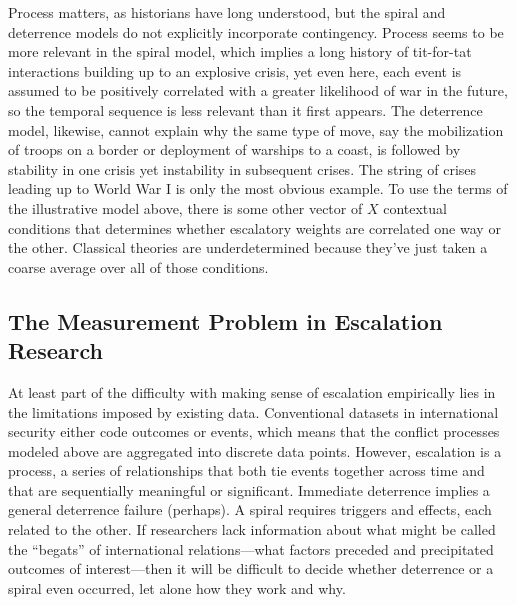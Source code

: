 \documentclass[
  letterpaper,
  DIV=11,
  numbers=noendperiod]{scrartcl}
\begin{document}
Process matters, as historians have long understood, but the spiral and
deterrence models do not explicitly incorporate contingency. Process
seems to be more relevant in the spiral model, which implies a long
history of tit-for-tat interactions building up to an explosive crisis,
yet even here, each event is assumed to be positively correlated with a
greater likelihood of war in the future, so the temporal sequence is
less relevant than it first appears. The deterrence model, likewise,
cannot explain why the same type of move, say the mobilization of troops
on a border or deployment of warships to a coast, is followed by
stability in one crisis yet instability in subsequent crises. The string
of crises leading up to World War I is only the most obvious example. To
use the terms of the illustrative model above, there is some other
vector of \(X\) contextual conditions that determines whether escalatory
weights are correlated one way or the other. Classical theories are
underdetermined because they've just taken a coarse average over all of
those conditions.

\subsection{The Measurement Problem in Escalation
Research}\label{the-measurement-problem-in-escalation-research}

At least part of the difficulty with making sense of escalation
empirically lies in the limitations imposed by existing data.
Conventional datasets in international security either code outcomes or
events, which means that the conflict processes modeled above are
aggregated into discrete data points. However, escalation is a process,
a series of relationships that both tie events together across time and
that are sequentially meaningful or significant. Immediate deterrence
implies a general deterrence failure (perhaps). A spiral requires
triggers and effects, each related to the other. If researchers lack
information about what might be called the ``begats'' of international
relations---what factors preceded and precipitated outcomes of
interest---then it will be difficult to decide whether deterrence or a
spiral even occurred, let alone how they work and why.
\end{document}
